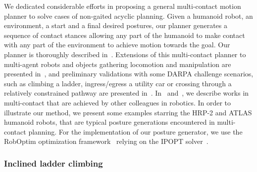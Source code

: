 
We dedicated considerable efforts in proposing a general multi-contact motion planner to solve cases of non-gaited acyclic planning.
Given a humanoid robot, an environment, a start and a final desired postures, our planner generates a sequence of contact stances allowing any part of the humanoid to make contact with any part of the environment to achieve motion towards the goal.
Our planner is thoroughly described in~\cite{escande:ras:2013}.
Extensions of this multi-contact planner to multi-agent robots and objects gathering locomotion and manipulation are presented in~\cite{bouyarmane:ar:2012}, and preliminary validations with some DARPA challenge scenarios, such as climbing a ladder, ingress/egress a utility car or crossing through a relatively constrained pathway are presented in~\cite{bouyarmane:humanoids:2012}.
In~\cite{escande:ras:2013} and~\cite{bouyarmane:ar:2012}, we describe works in multi-contact that are achieved by other colleagues in robotics.
In order to illustrate our method, we present some examples starring the HRP-2 and ATLAS humanoid robots, that are typical posture generations encountered in multi-contact planning.
For the implementation of our posture generator, we use the RobOptim optimization framework~\cite{moulard:jsme:2013}{} relying on the IPOPT solver~\cite{wachter:mp:2006}{}.



\subsubsection{Inclined ladder climbing}
\label{subsubsec:inclined_ladder_climbing}


